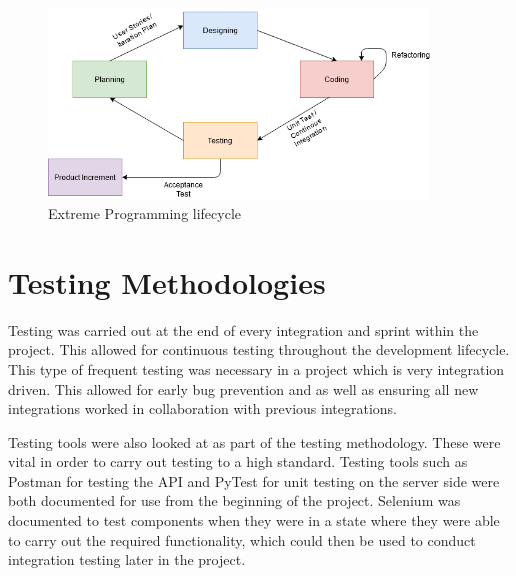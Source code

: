 \begin{figure}[h!]
 	\caption{Extreme Programming lifecycle}
	\label{image:xp}
 	\centering
 	\includegraphics[width=0.9\textwidth]{Images/XP Cycle.png}
\end{figure}	
\newpage
\section{Testing Methodologies}
Testing was carried out at the end of every integration and sprint within the project. This allowed for continuous testing throughout the development lifecycle. This type of frequent testing was necessary in a project which is very integration driven. This allowed for early bug prevention and as well as ensuring all new integrations worked in collaboration with previous integrations. \par
Testing tools were also looked at as part of the testing methodology. These were vital in order to carry out testing to a high standard. Testing tools such as Postman for testing the API and PyTest for unit testing on the server side were both documented for use from the beginning of the project. Selenium was documented to test components when they were in a state where they were able to carry out the required functionality, which could then be used to conduct integration testing later in the project.